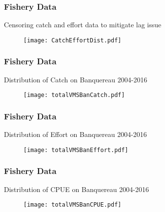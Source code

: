\documentclass{beamer}
\newcommand{\yr}{2016} %
\begin{document}
%
\begin{frame}
\frametitle{Fishery Data}
Censoring catch and effort data to mitigate lag issue

\begin{figure}
        \begin{center}
            \texttt{[image: CatchEffortDist.pdf]}
        \end{center}
    \end{figure}


\end{frame}



\begin{frame}
\frametitle{Fishery Data}
Distribution of Catch on Banquereau 2004-\yr

\begin{figure}
        \begin{center}
            \texttt{[image: totalVMSBanCatch.pdf]}
        \end{center}
    \end{figure}


\end{frame}

\begin{frame}
\frametitle{Fishery Data}
Distribution of Effort on Banquereau 2004-\yr

\begin{figure}
        \begin{center}
            \texttt{[image: totalVMSBanEffort.pdf]}
        \end{center}
    \end{figure}


\end{frame}

\begin{frame}
\frametitle{Fishery Data}
Distribution of CPUE on Banquereau 2004-\yr

\begin{figure}
        \begin{center}
            \texttt{[image: totalVMSBanCPUE.pdf]}
        \end{center}
    \end{figure}


\end{frame}
\end{document}
